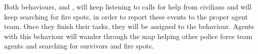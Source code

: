 Both behaviours,  and , will keep listening to calls for help from civilians and will keep searching for fire spots, in order to report these events to the proper agent team. Once they finish their tasks, they will be assigned to the  behaviour. Agents with this behaviour will wander through the map helping other police force team agents and searching for survivors and fire spots.

